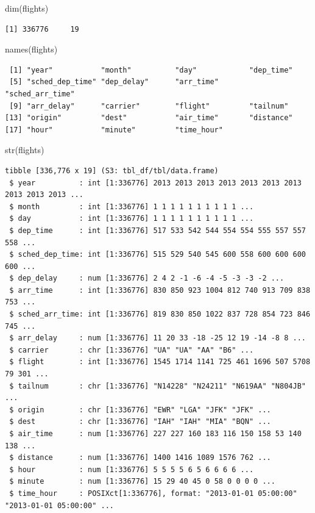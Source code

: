 \documentclass[
  10pt,
  letterpaper,
  DIV=11,
  numbers=noendperiod]{scrartcl}
\newenvironment{Shaded}{\begin{snugshade}}{\end{snugshade}}
\newcommand{\FunctionTok}[1]{\textcolor[rgb]{0.28,0.35,0.67}{#1}}
\newcommand{\NormalTok}[1]{\textcolor[rgb]{0.00,0.23,0.31}{#1}}
\begin{document}
\begin{Shaded}
\begin{Highlighting}[numbers=left,,]
\FunctionTok{dim}\NormalTok{(flights)}
\end{Highlighting}
\end{Shaded}

\begin{verbatim}
[1] 336776     19
\end{verbatim}

\begin{Shaded}
\begin{Highlighting}[numbers=left,,]
\FunctionTok{names}\NormalTok{(flights)}
\end{Highlighting}
\end{Shaded}

\begin{verbatim}
 [1] "year"           "month"          "day"            "dep_time"      
 [5] "sched_dep_time" "dep_delay"      "arr_time"       "sched_arr_time"
 [9] "arr_delay"      "carrier"        "flight"         "tailnum"       
[13] "origin"         "dest"           "air_time"       "distance"      
[17] "hour"           "minute"         "time_hour"     
\end{verbatim}

\begin{Shaded}
\begin{Highlighting}[numbers=left,,]
\FunctionTok{str}\NormalTok{(flights)}
\end{Highlighting}
\end{Shaded}

\begin{verbatim}
tibble [336,776 x 19] (S3: tbl_df/tbl/data.frame)
 $ year          : int [1:336776] 2013 2013 2013 2013 2013 2013 2013 2013 2013 2013 ...
 $ month         : int [1:336776] 1 1 1 1 1 1 1 1 1 1 ...
 $ day           : int [1:336776] 1 1 1 1 1 1 1 1 1 1 ...
 $ dep_time      : int [1:336776] 517 533 542 544 554 554 555 557 557 558 ...
 $ sched_dep_time: int [1:336776] 515 529 540 545 600 558 600 600 600 600 ...
 $ dep_delay     : num [1:336776] 2 4 2 -1 -6 -4 -5 -3 -3 -2 ...
 $ arr_time      : int [1:336776] 830 850 923 1004 812 740 913 709 838 753 ...
 $ sched_arr_time: int [1:336776] 819 830 850 1022 837 728 854 723 846 745 ...
 $ arr_delay     : num [1:336776] 11 20 33 -18 -25 12 19 -14 -8 8 ...
 $ carrier       : chr [1:336776] "UA" "UA" "AA" "B6" ...
 $ flight        : int [1:336776] 1545 1714 1141 725 461 1696 507 5708 79 301 ...
 $ tailnum       : chr [1:336776] "N14228" "N24211" "N619AA" "N804JB" ...
 $ origin        : chr [1:336776] "EWR" "LGA" "JFK" "JFK" ...
 $ dest          : chr [1:336776] "IAH" "IAH" "MIA" "BQN" ...
 $ air_time      : num [1:336776] 227 227 160 183 116 150 158 53 140 138 ...
 $ distance      : num [1:336776] 1400 1416 1089 1576 762 ...
 $ hour          : num [1:336776] 5 5 5 5 6 5 6 6 6 6 ...
 $ minute        : num [1:336776] 15 29 40 45 0 58 0 0 0 0 ...
 $ time_hour     : POSIXct[1:336776], format: "2013-01-01 05:00:00" "2013-01-01 05:00:00" ...
\end{verbatim}
\end{document}
